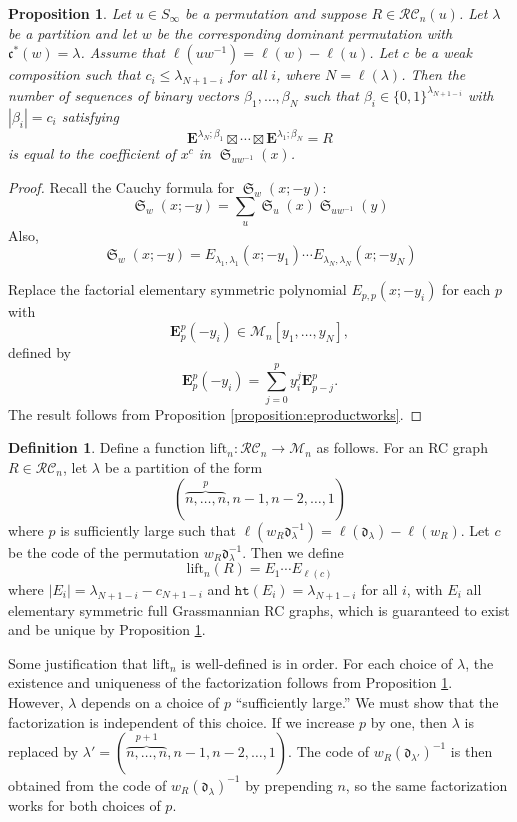 \documentclass{amsart}
\newtheorem{proposition}[lemma]{Proposition}
\theoremstyle{definition}
\newtheorem{definition}[lemma]{Definition}
\theoremstyle{remark}
\numberwithin{equation}{subsection}
\DeclareMathOperator{\sch}{\mathfrak{S}}
\newcommand{\wof}[1]{w_{#1}}
\newcommand{\hr}{\mathtt{ht}}
\newcommand{\RC}{\mathcal{RC}}
\newcommand{\dom}{\mathfrak{d}}
\newcommand{\code}{\mathfrak{c}}
\begin{document}
\begin{proposition} \label{proposition:elemfactor}
  Let $u\in S_\infty$ be a permutation and suppose $R\in \RC_n(u)$. Let $\lambda$ be a partition and let $w$ be the corresponding dominant permutation with $\code^*(w)=\lambda$. Assume that $\ell(uw^{-1}) = \ell(w)-\ell(u)$. Let $c$ be a weak composition such that $c_i\leq \lambda_{N + 1 - i}$ for all $i$, where $N=\ell(\lambda)$. Then the number of sequences of binary vectors $\beta_1,\ldots,\beta_N$ such that $\beta_i\in\{0,1\}^{\lambda_{N + 1 - i}}$ with $|\beta_i|=c_i$ satisfying
  $$\mathbf{E}^{\lambda_N;\beta_1}\boxtimes\cdots\boxtimes \mathbf{E}^{\lambda_1;\beta_N} = R$$
is equal to the coefficient of $x^c$ in $\sch_{uw^{-1}}(x)$.
\end{proposition}
\begin{proof}
  Recall the Cauchy formula for $\sch_w(x;-y)$:
  $$\sch_w(x;-y)=\sum_u \sch_u(x)\sch_{uw^{-1}}(y)$$
  Also,
  $$\sch_w(x;-y) = E_{\lambda_1,\lambda_1}(x;-y_1)\cdots E_{\lambda_N,\lambda_N}(x;-y_N)$$

Replace the factorial elementary symmetric polynomial $E_{p,p}(x;-y_i)$ for each $p$ with
$$\mathbf{E}_p^p(-y_i)\in \mathcal{M}_n[y_1,\ldots,y_N],$$
defined by
$$\mathbf{E}_p^p(-y_i) = \sum_{j=0}^p y_i^j \mathbf{E}_{p-j}^p.$$ 
The result follows from Proposition \ref{proposition:eproductworks}.
\end{proof}



\begin{definition}
  Define a function $\mathrm{lift}_n:\RC_n\to \mathcal{M}_n$ as follows. For an RC graph $R\in \RC_n$, let $\lambda$ be a partition of the form 
$$(\overbrace{n,\ldots,n}^{p},n-1,n-2,\ldots,1)$$
where $p$ is sufficiently large such that $\ell(\wof{R}\dom_\lambda^{-1}) = \ell(\dom_\lambda) - \ell(\wof{R})$.  Let $c$ be the code of the permutation $\wof{R}\dom_\lambda^{-1}$. Then we define
$$\mathrm{lift}_n(R) = E_1 \cdots  E_{\ell(c)}$$
where $|E_i| = \lambda_{N + 1 - i} - c_{N + 1 - i}$ and $\hr(E_i) = \lambda_{N+1-i}$ for all $i$, with $E_i$ all elementary symmetric full Grassmannian RC graphs, which is guaranteed to exist and be unique by Proposition \ref{proposition:elemfactor}. 
\end{definition}

Some justification that $\mathrm{lift}_n$ is well-defined is in order. For each choice of $\lambda$, the existence and uniqueness of the factorization follows from Proposition \ref{proposition:elemfactor}. However, $\lambda$ depends on a choice of $p$ ``sufficiently large.'' We must show that the factorization is independent of this choice. If we increase $p$ by one, then $\lambda$ is replaced by $\lambda' = (\overbrace{n,\ldots,n}^{p+1},n-1,n-2,\ldots,1)$. The code of $\wof{R}(\dom_{\lambda'})^{-1}$ is then obtained from the code of $\wof{R}(\dom_\lambda)^{-1}$ by prepending $n$, so the same factorization works for both choices of $p$.
\end{document}
